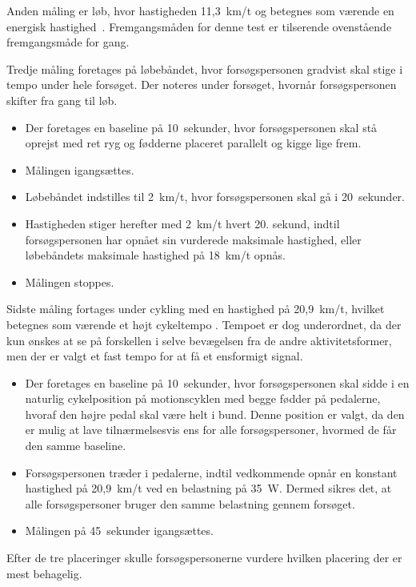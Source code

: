 Anden måling er løb, hvor hastigheden 11,3~km/t og betegnes som værende en energisk hastighed~\citep{Miles2007}. Fremgangsmåden for denne test er tilserende ovenstående fremgangsmåde for gang.

Tredje måling foretages på løbebåndet, hvor forsøgspersonen gradvist skal stige i tempo under hele forsøget. Der noteres under forsøget, hvornår forsøgspersonen skifter fra gang til løb.  %
\begin{itemize}
	\item Der foretages en baseline på 10~sekunder, hvor forsøgspersonen skal stå oprejst med ret ryg og fødderne placeret parallelt og kigge lige frem.
	\item Målingen igangsættes.
	\item Løbebåndet indstilles til 2~km/t, hvor forsøgspersonen skal gå i 20~sekunder.  
	\item Hastigheden stiger herefter med 2~km/t hvert 20. sekund, indtil forsøgspersonen har opnået sin vurderede maksimale hastighed, eller løbebåndets maksimale hastighed på 18~km/t opnås. 
	\item Målingen stoppes. 
\end{itemize}

Sidste måling fortages under cykling med en hastighed på 20,9~km/t, hvilket betegnes som værende et højt cykeltempo \citep{Miles2007}. Tempoet er dog underordnet, da der kun ønskes at se på forskellen i selve bevægelsen fra de andre aktivitetsformer, men der er valgt et fast tempo for at få et ensformigt signal. %
\begin{itemize}
	\item Der foretages en baseline på 10~sekunder, hvor forsøgspersonen skal sidde i en naturlig cykelposition på motionscyklen med begge fødder på pedalerne, hvoraf den højre pedal skal være helt i bund. Denne position er valgt, da den er mulig at lave tilnærmelsesvis ens for alle forsøgspersoner, hvormed de får den samme baseline.
	\item Forsøgspersonen træder i pedalerne, indtil vedkommende opnår en konstant hastighed på 20,9~km/t ved en belastning på 35~W. Dermed sikres det, at alle forsøgspersoner bruger den samme belastning gennem forsøget.  
	\item Målingen på 45~sekunder igangsættes. 
\end{itemize}
Efter de tre placeringer skulle forsøgspersonerne vurdere hvilken placering der er mest behagelig.

